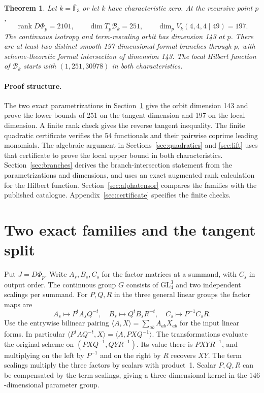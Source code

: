\documentclass[11pt]{amsart}
\newtheorem{theorem}{Theorem}
\newcommand{\F}{\mathbb F}
\newcommand{\Br}{\mathcal B}
\newcommand{\rk}{\operatorname{rank}}
\begin{document}
\begin{theorem}\label{thm:main}
Let $k=\overline{\F}_3$ or let $k$ have characteristic zero. At the
recursive point $p$,
\[
 \rk D\Phi_p=2101,\qquad
 \dim T_p\Br_k=251,\qquad
 \dim_p V_k(4,4,4\mid49)=197.
\]
The continuous isotropy and term-rescaling orbit has dimension 143
at $p$. There are at least two distinct smooth 197-dimensional
formal branches through $p$, with scheme-theoretic formal
intersection of dimension 143. The local Hilbert function of
$\Br_k$ starts with $(1,251,30978)$ in both characteristics.
\end{theorem}

\paragraph{Proof structure.}
The two exact parametrizations in Section~\ref{sec:families} give
the orbit dimension 143 and prove the lower bounds of 251 on
the tangent dimension and 197 on the local dimension. A finite
rank check gives the reverse tangent inequality. The finite
quadratic certificate verifies the 54 functionals and their
pairwise coprime leading monomials. The algebraic argument in
Sections~\ref{sec:quadratics} and \ref{sec:lift} uses that
certificate to prove the local upper bound in both characteristics.
Section~\ref{sec:branches} derives the branch-intersection statement
from the parametrizations and dimensions, and uses an exact
augmented rank calculation for the Hilbert function.
Section~\ref{sec:alphatensor} compares the families with the published
catalogue. Appendix~\ref{sec:certificate} specifies the finite checks.

\section{Two exact families and the tangent split}\label{sec:families}

Put $J=D\Phi_p$. Write $A_s,B_s,C_s$ for the factor matrices at a
summand, with $C_s$ in output order. The continuous group $G$ consists
of $\mathrm{GL}_4^3$ and two independent scalings per summand. For
$P,Q,R$ in the three general linear groups the factor maps are
\[
 A_s\longmapsto P^t A_s Q^{-t},\quad
 B_s\longmapsto Q^t B_s R^{-t},\quad
 C_s\longmapsto P^{-1} C_s R .
\]
Use the entrywise bilinear pairing $\langle A,X\rangle=\sum_{ab}
A_{ab}X_{ab}$ for the input linear forms. In particular
$\langle P^t A Q^{-t},X\rangle=\langle A,PXQ^{-1}\rangle$.
The transformations evaluate the original scheme on
$(PXQ^{-1},QYR^{-1})$. Its value there is $PXYR^{-1}$, and multiplying
on the left by $P^{-1}$ and on the right by $R$ recovers $XY$.
The term scalings
multiply the three factors by scalars with product~1.
Scalar $P,Q,R$ can be compensated by the term scalings, giving a
three-dimensional kernel in the $146$-dimensional parameter group.
\end{document}
